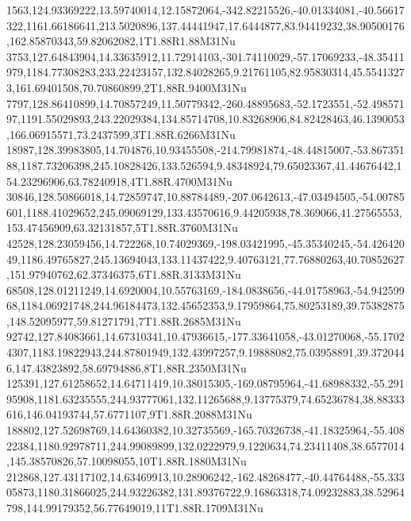 1563,124.93369222,13.59740014,12.15872064,-342.82215526,-40.01334081,-40.56617322,1161.66186641,213.5020896,137.44441947,17.6444877,83.94419232,38.90500176,162.85870343,59.82062082,1T1.88R1.88M31Nu
3753,127.64843904,14.33635912,11.72914103,-301.74110029,-57.17069233,-48.35411979,1184.77308283,233.22423157,132.84028265,9.21761105,82.95830314,45.55413273,161.69401508,70.70860899,2T1.88R.9400M31Nu
7797,128.86410899,14.70857249,11.50779342,-260.48895683,-52.1723551,-52.49857197,1191.55029893,243.22029384,134.85714708,10.83268906,84.82428463,46.1390053,166.06915571,73.2437599,3T1.88R.6266M31Nu
18987,128.39983805,14.704876,10.93455508,-214.79981874,-48.44815007,-53.86735188,1187.73206398,245.10828426,133.526594,9.48348924,79.65023367,41.44676442,154.23296906,63.78240918,4T1.88R.4700M31Nu
30846,128.50866018,14.72859747,10.88784489,-207.0642613,-47.03494505,-54.00785601,1188.41029652,245.09069129,133.43570616,9.44205938,78.369066,41.27565553,153.47456909,63.32131857,5T1.88R.3760M31Nu
42528,128.23059456,14.722268,10.74029369,-198.03421995,-45.35340245,-54.42642049,1186.49765827,245.13694043,133.11437422,9.40763121,77.76880263,40.70852627,151.97940762,62.37346375,6T1.88R.3133M31Nu
68508,128.01211249,14.6920004,10.55763169,-184.0838656,-44.01758963,-54.94259968,1184.06921748,244.96184473,132.45652353,9.17959864,75.80253189,39.75382875,148.52095977,59.81271791,7T1.88R.2685M31Nu
92742,127.84083661,14.67310341,10.47936615,-177.33641058,-43.01270068,-55.17024307,1183.19822943,244.87801949,132.43997257,9.19888082,75.03958891,39.3720446,147.43823892,58.69794886,8T1.88R.2350M31Nu
125391,127.61258652,14.64711419,10.38015305,-169.08795964,-41.68988332,-55.29195908,1181.63235555,244.93777061,132.11265688,9.13775379,74.65236784,38.88333616,146.04193744,57.6771107,9T1.88R.2088M31Nu
188802,127.52698769,14.64360382,10.32735569,-165.70326738,-41.18325964,-55.40822384,1180.92978711,244.99089899,132.0222979,9.1220634,74.23411408,38.6577014,145.38570826,57.10098055,10T1.88R.1880M31Nu
212868,127.43117102,14.63469913,10.28906242,-162.48268477,-40.44764488,-55.33305873,1180.31866025,244.93226382,131.89376722,9.16863318,74.09232883,38.52964798,144.99179352,56.77649019,11T1.88R.1709M31Nu
